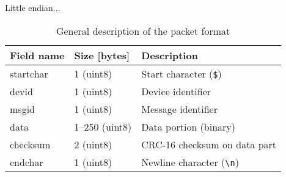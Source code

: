 \documentclass{article}
\begin{document}
Little endian...  

\begin{table}[htbp]
	\centering
	\begin{tabular}{lll}
		\toprule
		\textbf{Field name} & \textbf{Size [bytes]} & \textbf{Description}\\
		\midrule
		startchar & 1 (uint8) & Start character (\texttt{\$}) \\
		devid & 1 (uint8) & Device identifier \\
		msgid & 1 (uint8) & Message identifier \\
		data & 1--250 (uint8) & Data portion (binary)\\
		checksum & 2 (uint8) & CRC-16 checksum on data part \\
		endchar & 1 (uint8) & Newline character (\texttt{\textbackslash n})\\
		\bottomrule
	\end{tabular}
	\label{tab:general}
	\caption{General description of the packet format}
\end{table}
\end{document}

